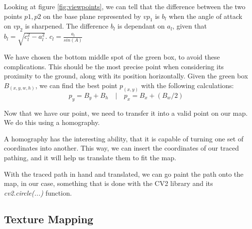 Looking at figure \ref{fig:viewpoints}, we can tell that the difference between the two points \(p1,p2\) on the base plane represented by \(vp_1\) is \(b_l\) when the angle of attack on \(vp_2\) is sharpened. The difference \(b_l\) is dependant on \(a_l\), given that \(b_l = \sqrt{c_l^2-a_l^2}\). \(c_l = \frac{a_l}{sin(A)}\)\newline

We have chosen the bottom middle spot of the green box, to avoid these complications. This should be the most precise point when considering its proximity to the ground, along with its position horizontally. Given the green box \(B_(x,y,w,h)\), we can find the best point \(p_(x,y)\) with the following calculations:
\[p_y = B_y+B_h \quad | \quad p_x = B_x + (B_w / 2)\]

Now that we have our point, we need to transfer it into a valid point on our map. We do this using a homography.

A homography has the interesting ability, that it is capable of turning one set of coordinates into another. This way, we can insert the coordinates of our traced pathing, and it will help us translate them to fit the map.

With the traced path in hand and translated, we can go paint the path onto the map, in our case, something that is done with the CV2 library and its \textsl{cv2.circle(...)} function.

\subsection{Texture Mapping}
